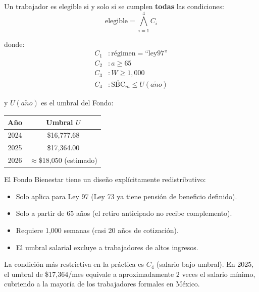 \documentclass[11pt,a4paper]{report}
\theoremstyle{remark}
\begin{document}
\begin{tcolorbox}[colback=blue!5!white, colframe=blue!75!black, title=\textbf{Definici\'on Formal}]
Un trabajador es elegible si y solo si se cumplen \textbf{todas} las condiciones:
\begin{equation}
\text{elegible} = \bigwedge_{i=1}^{4} C_i
\label{eq:elegibilidad_fondo}
\end{equation}

donde:
\begin{align}
C_1 &: \text{r\'egimen} = \text{``ley97''} \\
C_2 &: a \geq 65 \\
C_3 &: W \geq 1{,}000 \\
C_4 &: \overline{\text{SBC}}_m \leq U(a\tilde{n}o)
\end{align}

y $U(a\tilde{n}o)$ es el umbral del Fondo:
\begin{center}
\begin{tabular}{cc}
\toprule
A\~no & Umbral $U$ \\
\midrule
2024 & \$16,777.68 \\
2025 & \$17,364.00 \\
2026 & $\approx$\$18,050 (estimado) \\
\bottomrule
\end{tabular}
\end{center}
\end{tcolorbox}

\begin{tcolorbox}[colback=green!5!white, colframe=green!50!black, title=\textbf{Intuici\'on}]
El Fondo Bienestar tiene un dise\~no expl\'icitamente redistributivo:
\begin{itemize}
  \item Solo aplica para Ley 97 (Ley 73 ya tiene pensi\'on de beneficio definido).
  \item Solo a partir de 65 a\~nos (el retiro anticipado no recibe complemento).
  \item Requiere 1,000 semanas (casi 20 a\~nos de cotizaci\'on).
  \item El umbral salarial excluye a trabajadores de altos ingresos.
\end{itemize}

La condici\'on m\'as restrictiva en la pr\'actica es $C_4$ (salario bajo umbral). En 2025, el umbral de \$17,364/mes equivale a aproximadamente 2 veces el salario m\'inimo, cubriendo a la mayor\'ia de los trabajadores formales en M\'exico.
\end{tcolorbox}
\end{document}
